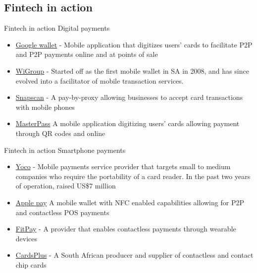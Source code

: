 \documentclass[9pt]{beamer}
\begin{document}

\subsection{Fintech in action}

\begin{frame}{Fintech in action}
	Digital payments
	\begin{itemize}
		\item \href{https://www.google.com/wallet/}{Google wallet} - Mobile application that digitizes users' cards to facilitate P2P and P2P payments online and at points of sale
		\item \href{www.wigroupinternational.com}{WiGroup} - Started off as the first mobile wallet in SA in 2008, and has since evolved into a facilitator of mobile transaction services.
		\item \href{http://www.snapscan.co.za}{Snapscan} - A pay-by-proxy allowing businesses to accept card transactions with mobile phones
		\item \href{https://masterpass.com}{MasterPass} A mobile application digitizing users' cards allowing payment through QR codes and online
	\end{itemize}
\end{frame}



\begin{frame}{Fintech in action}
	Smartphone payments
	\begin{itemize}
		\item \href{https://www.yoco.co.za/}{Yoco} - Mobile payments service provider that targets small to medium companies who require the portability of a card reader. In the past two years of operation, raised US\$7 million
		\item \href{https://www.apple.com/apple-pay/}{Apple pay} A mobile wallet with NFC enabled capabilities allowing for P2P and contactless POS payments
		\item \href{http://www.fit-pay.com}{FitPay} - A provider that enables contactless payments through wearable devices
		\item \href{http://cardsplus.co.za}{CardsPlus} - A South African producer and supplier of contactless and contact chip cards
	\end{itemize}
\end{frame}
\end{document}
